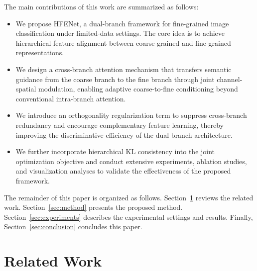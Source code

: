 \documentclass[pdflatex,sn-mathphys-num]{sn-jnl}
\theoremstyle{thmstyleone}%
\theoremstyle{thmstyletwo}%
\theoremstyle{thmstylethree}%
\begin{document}
The main contributions of this work are summarized as follows:
\begin{itemize}
    \item We propose HFENet, a dual-branch framework for fine-grained image classification under limited-data settings. The core idea is to achieve hierarchical feature alignment between coarse-grained and fine-grained representations.
    \item We design a cross-branch attention mechanism that transfers semantic guidance from the coarse branch to the fine branch through joint channel-spatial modulation, enabling adaptive coarse-to-fine conditioning beyond conventional intra-branch attention.
    \item We introduce an orthogonality regularization term to suppress cross-branch redundancy and encourage complementary feature learning, thereby improving the discriminative efficiency of the dual-branch architecture.
    \item We further incorporate hierarchical KL consistency into the joint optimization objective and conduct extensive experiments, ablation studies, and visualization analyses to validate the effectiveness of the proposed framework.
\end{itemize}

The remainder of this paper is organized as follows. 
Section~\ref{sec:related_work} reviews the related work. 
Section~\ref{sec:method} presents the proposed method. 
Section~\ref{sec:experiments} describes the experimental settings and results. 
Finally, Section~\ref{sec:conclusion} concludes this paper.

\section{Related Work}
\label{sec:related_work}
\end{document}
